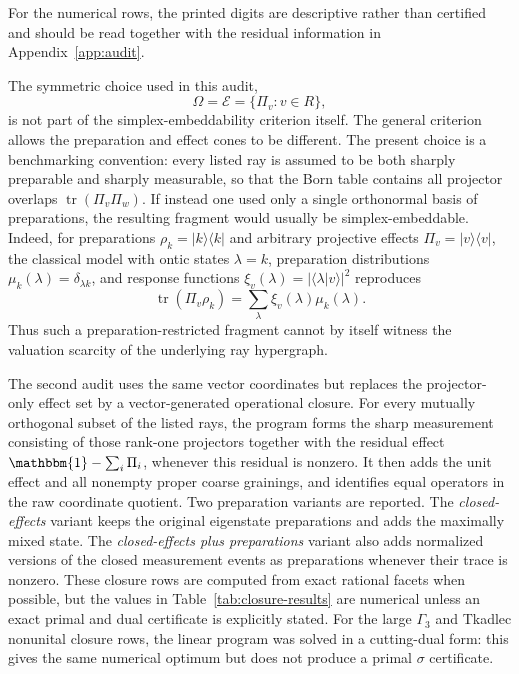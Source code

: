 \documentclass[aps,pra,twocolumn,superscriptaddress,nofootinbib]{revtex4-2}
\newcommand{\id}{\mathbbm{1}}
\begin{document}
For the numerical rows, the printed digits are descriptive rather than
certified and should be read together with the residual information in
Appendix~\ref{app:audit}.


The symmetric choice used in this audit,
\[
        \Omega=\mathcal E=\{\Pi_v:v\in R\},
\]
is not part of the simplex-embeddability criterion itself.  The general
criterion allows the preparation and effect cones to be different.  The present
choice is a benchmarking convention: every listed ray is assumed to be both
sharply preparable and sharply measurable, so that the Born table contains all
projector overlaps \(\operatorname{tr}(\Pi_v\Pi_w)\).  If instead one used only
a single orthonormal basis of preparations, the resulting fragment would usually
be simplex-embeddable.  Indeed, for preparations
\(\rho_k=|k\rangle\langle k|\) and arbitrary projective effects
\(\Pi_v=|v\rangle\langle v|\), the classical model with ontic states
\(\lambda=k\), preparation distributions
\(\mu_k(\lambda)=\delta_{\lambda k}\), and response functions
\(\xi_v(\lambda)=|\langle \lambda|v\rangle|^2\) reproduces
\[
        \operatorname{tr}(\Pi_v\rho_k)
        =
        \sum_\lambda \xi_v(\lambda)\mu_k(\lambda).
\]
Thus such a preparation-restricted fragment cannot by itself witness the
valuation scarcity of the underlying ray hypergraph.

The second audit uses the same vector coordinates but replaces the
projector-only effect set by a vector-generated operational closure.  For every
mutually orthogonal subset of the listed rays, the program forms the sharp
measurement consisting of those rank-one projectors together with the residual
effect \(\id-\sum_i\Pi_i\), whenever this residual is nonzero.  It then adds
the unit effect and all nonempty proper coarse grainings, and identifies equal
operators in the raw coordinate quotient.  Two preparation variants are
reported.  The \emph{closed-effects} variant keeps the original eigenstate
preparations and adds the maximally mixed state.  The \emph{closed-effects plus
preparations} variant also adds normalized versions of the closed measurement
events as preparations whenever their trace is nonzero.  These closure rows are
computed from exact rational facets when possible, but the values in
Table~\ref{tab:closure-results} are numerical unless an exact primal and dual
certificate is explicitly stated.  For the large $\Gamma_3$ and Tkadlec
nonunital closure rows, the
linear program was solved in a cutting-dual form: this gives the same numerical
optimum but does not produce a primal \(\sigma\) certificate.
\end{document}
